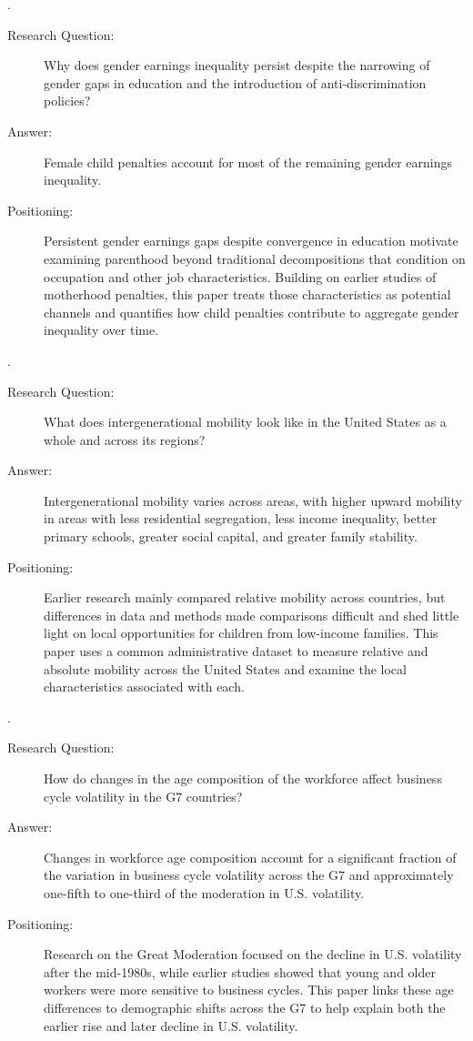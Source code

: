 \documentclass[12pt,a4paper]{article}
\begin{document}
\bigskip
\noindent{}.

\begin{description}
  \item[Research Question:] Why does gender earnings inequality persist despite the narrowing of gender gaps in education and the introduction of anti-discrimination policies?
  \item[Answer:] Female child penalties account for most of the remaining gender earnings inequality.
  \item[Positioning:] Persistent gender earnings gaps despite convergence in education motivate examining parenthood beyond traditional decompositions that condition on occupation and other job characteristics. Building on earlier studies of motherhood penalties, this paper treats those characteristics as potential channels and quantifies how child penalties contribute to aggregate gender inequality over time.
\end{description}

\bigskip
\noindent{}.

\begin{description}
  \item[Research Question:] What does intergenerational mobility look like in the United States as a whole and across its regions?
  \item[Answer:] Intergenerational mobility varies across areas, with higher upward mobility in areas with less residential segregation, less income inequality, better primary schools, greater social capital, and greater family stability.
  \item[Positioning:] Earlier research mainly compared relative mobility across countries, but differences in data and methods made comparisons difficult and shed little light on local opportunities for children from low-income families. This paper uses a common administrative dataset to measure relative and absolute mobility across the United States and examine the local characteristics associated with each.
\end{description}

\bigskip
\noindent{}.

\begin{description}
  \item[Research Question:] How do changes in the age composition of the workforce affect business cycle volatility in the G7 countries?
  \item[Answer:] Changes in workforce age composition account for a significant fraction of the variation in business cycle volatility across the G7 and approximately one-fifth to one-third of the moderation in U.S. volatility.
  \item[Positioning:] Research on the Great Moderation focused on the decline in U.S. volatility after the mid-1980s, while earlier studies showed that young and older workers were more sensitive to business cycles. This paper links these age differences to demographic shifts across the G7 to help explain both the earlier rise and later decline in U.S. volatility.
\end{description}
\end{document}

